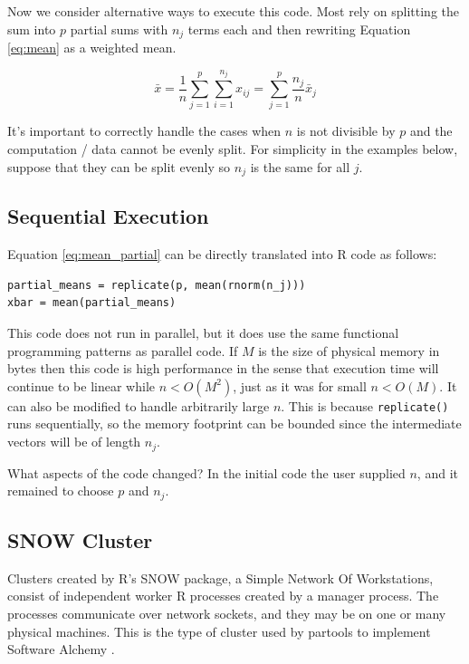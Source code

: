\documentclass[12pt]{article}
\begin{document}
Now we consider alternative ways to execute this code.  Most rely on
splitting the sum into $p$ partial sums with $n_j$ terms each and then rewriting
Equation \ref{eq:mean} as a weighted mean.

\begin{equation}
    \bar{x} = \frac{1}{n} \sum_{j = 1}^p \sum_{i = 1}^{n_j} x_{ij}
    = \sum_{j = 1}^p \frac{n_j}{n} \bar{x}_j
\label{eq:mean_partial}
\end{equation}

It's important to correctly handle the cases when $n$ is not divisible by $p$
and the computation / data cannot be evenly split. For simplicity in the
examples below, suppose that they can be split evenly so $n_j$ is the same
for all $j$.

\subsection{Sequential Execution}
\label{section:sequential}

Equation \ref{eq:mean_partial} can be directly translated into R code as
follows:

\begin{verbatim}
partial_means = replicate(p, mean(rnorm(n_j)))
xbar = mean(partial_means)
\end{verbatim}

This code does not run in parallel, but it does use the same functional
programming patterns as parallel code. If $M$ is the size of physical memory in
bytes then this code is high performance in the sense
that execution time will continue to be linear while $n < O(M^2)$, just
as it was for small $n < O(M)$. It can also be modified to handle
arbitrarily large $n$. This is because \texttt{replicate()} runs
sequentially, so the memory footprint can be bounded since the intermediate
vectors will be of length $n_j$. 

What aspects of the code changed? In the initial code the user
supplied $n$, and it remained to choose $p$ and $n_j$.

\subsection{SNOW Cluster}

Clusters created by R's SNOW package, a Simple Network Of Workstations,
consist of independent worker R processes created by a manager process. The
processes communicate over network sockets, and they may be on one or many
physical machines.  This is the type of cluster used by partools to
implement Software Alchemy \cite{R-partools} \cite{matloff2014software}.  
\end{document}
